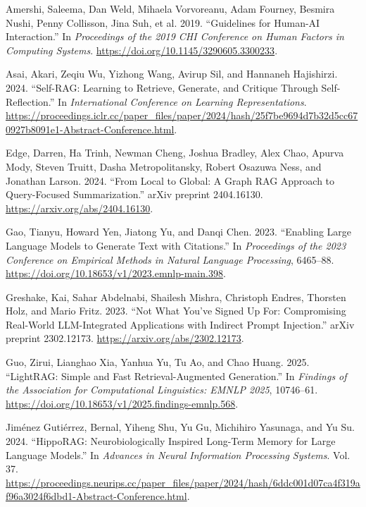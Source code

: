 \documentclass[
  11pt,
]{article}
\newlength{\cslhangindent}
\newenvironment{CSLReferences}[2] %
 {\begin{list}{}{%
  \setlength{\itemindent}{0pt}
  \setlength{\leftmargin}{0pt}
  \setlength{\parsep}{0pt}
  \ifodd #1
   \setlength{\leftmargin}{\cslhangindent}
   \setlength{\itemindent}{-1\cslhangindent}
  \fi
  \setlength{\itemsep}{#2\baselineskip}}}
 {\end{list}}
\begin{document}
\label{refs}
\begin{CSLReferences}{1}{0}
Amershi, Saleema, Dan Weld, Mihaela Vorvoreanu, Adam Fourney, Besmira
Nushi, Penny Collisson, Jina Suh, et al. 2019. {``Guidelines for
Human-AI Interaction.''} In \emph{Proceedings of the 2019 CHI Conference
on Human Factors in Computing Systems}.
\url{https://doi.org/10.1145/3290605.3300233}.

Asai, Akari, Zeqiu Wu, Yizhong Wang, Avirup Sil, and Hannaneh
Hajishirzi. 2024. {``Self-RAG: Learning to Retrieve, Generate, and
Critique Through Self-Reflection.''} In \emph{International Conference
on Learning Representations}.
\url{https://proceedings.iclr.cc/paper_files/paper/2024/hash/25f7be9694d7b32d5cc670927b8091e1-Abstract-Conference.html}.

Edge, Darren, Ha Trinh, Newman Cheng, Joshua Bradley, Alex Chao, Apurva
Mody, Steven Truitt, Dasha Metropolitansky, Robert Osazuwa Ness, and
Jonathan Larson. 2024. {``From Local to Global: A Graph RAG Approach to
Query-Focused Summarization.''} arXiv preprint 2404.16130.
\url{https://arxiv.org/abs/2404.16130}.

Gao, Tianyu, Howard Yen, Jiatong Yu, and Danqi Chen. 2023. {``Enabling
Large Language Models to Generate Text with Citations.''} In
\emph{Proceedings of the 2023 Conference on Empirical Methods in Natural
Language Processing}, 6465--88.
\url{https://doi.org/10.18653/v1/2023.emnlp-main.398}.

Greshake, Kai, Sahar Abdelnabi, Shailesh Mishra, Christoph Endres,
Thorsten Holz, and Mario Fritz. 2023. {``Not What You've Signed Up For:
Compromising Real-World LLM-Integrated Applications with Indirect Prompt
Injection.''} arXiv preprint 2302.12173.
\url{https://arxiv.org/abs/2302.12173}.

Guo, Zirui, Lianghao Xia, Yanhua Yu, Tu Ao, and Chao Huang. 2025.
{``LightRAG: Simple and Fast Retrieval-Augmented Generation.''} In
\emph{Findings of the Association for Computational Linguistics: EMNLP
2025}, 10746--61.
\url{https://doi.org/10.18653/v1/2025.findings-emnlp.568}.

Jiménez Gutiérrez, Bernal, Yiheng Shu, Yu Gu, Michihiro Yasunaga, and Yu
Su. 2024. {``HippoRAG: Neurobiologically Inspired Long-Term Memory for
Large Language Models.''} In \emph{Advances in Neural Information
Processing Systems}. Vol. 37.
\url{https://proceedings.neurips.cc/paper_files/paper/2024/hash/6ddc001d07ca4f319af96a3024f6dbd1-Abstract-Conference.html}.


\end{CSLReferences}
\end{document}
